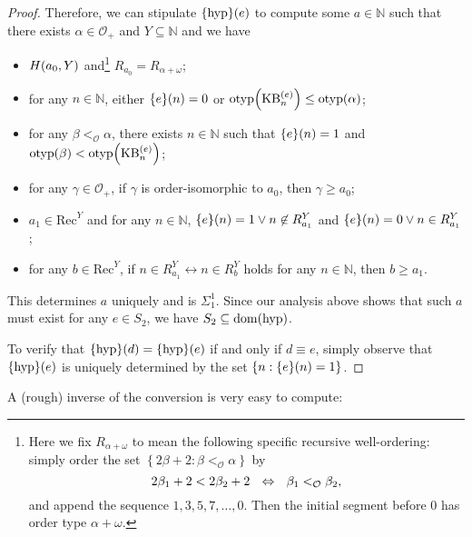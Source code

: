 \documentclass[11pt]{article}
\theoremstyle{plain}
\theoremstyle{definition}
\newcommand{\Rec}{\mathrm{Rec}}
\DeclareMathOperator{\dom}{dom}
\DeclareMathOperator{\otyp}{otyp}
\DeclareMathOperator{\KB}{KB}
\begin{document}
\begin{proof}
    Therefore, we can stipulate $\mleft\{\mathrm{hyp}\mright\}\mleft(e\mright)$ to compute some $a \in \mathbb{N}$ such that there exists $\alpha \in \mathcal{O}_+$ and $Y \subseteq \mathbb{N}$ and we have
    \begin{itemize}
        \item $H\mleft(a_0, Y\mright)$ and\footnote{Here we fix $R_{\alpha + \omega}$ to mean the following specific recursive well-ordering: simply order the set $\left\{2\beta + 2 : \beta <_\mathcal{O} \alpha\right\}$ by
                  \[2\beta_1 + 2 < 2\beta_2 + 2 \ \ \ratio\Leftrightarrow \ \ \beta_1 <_\mathcal{O} \beta_2,\]
                  and append the sequence $1, 3, 5, 7, \ldots, 0$. Then the initial segment before $0$ has order type $\alpha + \omega$.} $R_{a_0} = R_{\alpha + \omega}$;
        \item for any $n \in \mathbb{N}$, either $\mleft\{e\mright\}\mleft(n\mright) = 0$ or $\otyp\mleft(\KB^{(e)}_n\mright) \leq \otyp\mleft(\alpha\mright)$;
        \item for any $\beta <_\mathcal{O} \alpha$, there exists $n \in \mathbb{N}$ such that $\mleft\{e\mright\}\mleft(n\mright) = 1$ and $\otyp\mleft(\beta\mright) < \otyp\mleft(\KB^{(e)}_n\mright)$;
        \item for any $\gamma \in \mathcal{O}_+$, if $\gamma$ is order-isomorphic to $a_0$, then $\gamma \geq a_0$;
        \item $a_1 \in \Rec^Y$ and for any $n \in \mathbb{N}$, $\mleft\{e\mright\}\mleft(n\mright) = 1 \lor n \not\in R^Y_{a_1}$ and $\mleft\{e\mright\}\mleft(n\mright) = 0 \lor n \in R^Y_{a_1}$;
        \item for any $b \in \Rec^Y$, if $n \in R^Y_{a_1} \leftrightarrow n \in R^Y_b$ holds for any $n \in \mathbb{N}$, then $b \geq a_1$.
    \end{itemize}
    This determines $a$ uniquely and is $\Sigma^1_1$. Since our analysis above shows that such $a$ must exist for any $e \in S_2$, we have $S_2 \subseteq \dom\mleft(\mathrm{hyp}\mright)$.

    To verify that $\mleft\{\mathrm{hyp}\mright\}\mleft(d\mright) = \mleft\{\mathrm{hyp}\mright\}\mleft(e\mright)$ if and only if $d \equiv e$, simply observe that $\mleft\{\mathrm{hyp}\mright\}\mleft(e\mright)$ is uniquely determined by the set $\left\{n : \mleft\{e\mright\}\mleft(n\mright) = 1\right\}$.
\end{proof}

A (rough) inverse of the conversion is very easy to compute:
\end{document}
